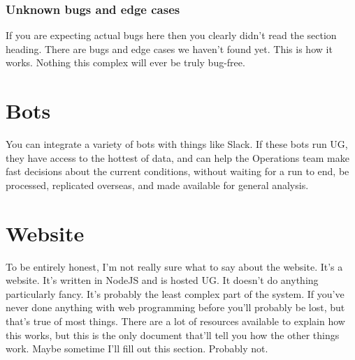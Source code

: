 \subsubsection{Unknown bugs and edge cases}

If you are expecting actual bugs here then you clearly didn't read the section heading.
There are bugs and edge cases we haven't found yet.
This is how it works.
Nothing this complex will ever be truly bug-free.

\section{Bots}

You can integrate a variety of bots with things like Slack.
If these bots run UG, they have access to the hottest of data, and can help the Operations team make fast decisions about the current conditions, without waiting for a run to end, be processed, replicated overseas, and made available for general analysis.

\section{Website}

To be entirely honest, I'm not really sure what to say about the website.
It's a website.
It's written in NodeJS and is hosted UG.
It doesn't do anything particularly fancy.
It's probably the least complex part of the system.
If you've never done anything with web programming before you'll probably be lost, but that's true of most things.
There are a lot of resources available to explain how this works, but this is the only document that'll tell you how the other things work.
Maybe sometime I'll fill out this section.
Probably not.
